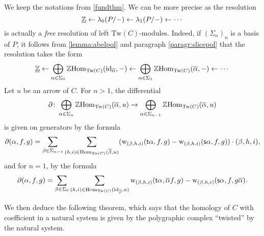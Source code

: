 \documentclass{amsart}
\newcommand{\Tw}[1]{\mathrm{Tw}(#1)}
\newcommand{\id}{\mathrm{id}}
\newcommand{\src}[1]{\source{} #1}
\newcommand{\tgt}[1]{\target{} #1}
\renewcommand{\homset}[3]{\mathrm{Hom}_{#1}(#2,#3)}
\newcommand{\wght}[1]{\mathrm{w}_{#1}}
\begin{document}
  \begin{paragr}\label{paragr:descres}
    We keep the notations from \cref{fundthm}. We can be more
    precise as the resolution
    \[
      \underline{\mathbb Z} \leftarrow \lambda_0(P/-) \leftarrow
      \lambda_1(P/-) \leftarrow \cdots
    \]
    is actually a \emph{free} resolution of left
    $\Tw{C}$\nbd-modules. %
    Indeed, if $(\Sigma_n)_n$ is a basis of $P$, it follows from
    \cref{lemma:abelpol} and paragraph \ref{paragr:slicepol} that the resolution takes the form
    \[
       \cst{\Z} \leftarrow \bigoplus_{\alpha \in \Sigma_0}\Z
       \homset{\Tw{C}}{\id_{\overline{\alpha}}}{-} \leftarrow \bigoplus_{\alpha \in \Sigma_1}\Z
       \homset{\Tw{C}}{\overline{\alpha}}{-} \leftarrow %
       \cdots
     \]
     Let $u$ be an arrow of $C$. For $n>1$, the differential
     \[
       \partial \colon \bigoplus_{\alpha \in
         \Sigma_{n}}\Z\homset{\Tw{C}}{\overline{\alpha}}{u} \to \bigoplus_{\alpha \in
         \Sigma_{n-1}}\Z\homset{\Tw{C}}{\overline{\alpha}}{u}
     \]
     is given on generators by the formula
     \[
       \partial(\alpha,f,g)=\sum_{\beta \in
         \Sigma_{n-1}}\sum_{(h,i)\in
         \homset{\Tw{C}}{\overline{\beta}}{u}}(\wght{(\beta,h,i)}(\tgt{\alpha},f,g)
       -\wght{(\beta,h,i)}(\src{\alpha},f,g))\cdot(\beta,h,i),
     \]
     and for $n=1$, by the formula
     \[
       \partial(\alpha,f,g)=\sum_{\beta \in \Sigma_0}\sum_{(h,i)\in \homset{\Tw{C}}{\id_{\overline{\beta}}}{u}}\wght{(\beta,h,i)}(\tgt{\alpha},\overline{\alpha}f,g)-\wght{(\beta,h,i)}(\src{\alpha},f,g\overline{\alpha}).
     \]
  \end{paragr}
  We then deduce the following theorem, which says that the homology
  of $C$ with coefficient in a natural system is given by the
  polygraphic complex ``twisted'' by the natural system.
\end{document}
